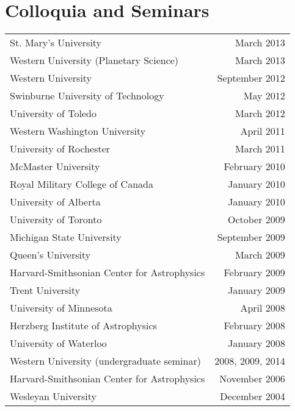 \documentclass[12pt]{article}
\begin{document}
\section{Colloquia and Seminars}
\begin{tabularx}{\textwidth}{Xr}
St. Mary's University& March 2013\\ %
Western University (Planetary Science)& March 2013\\ %
Western University& September 2012\\ %
Swinburne University of Technology& May 2012\\  %
University of Toledo& March 2012\\ %
Western Washington University& April 2011\\ %
University of Rochester& March 2011\\ %
McMaster University&  February 2010\\ %
Royal Military College of Canada& January 2010\\ %
University of Alberta& January 2010\\ %
University of Toronto&  October 2009\\%
Michigan State University& September 2009\\%
Queen's University& March 2009\\ %
Harvard-Smithsonian Center for Astrophysics& February 2009\\ %
Trent University& January 2009\\ %
University of Minnesota& April 2008\\ %
Herzberg Institute of Astrophysics& February 2008\\ %
University of Waterloo& January 2008\\ %
Western University (undergraduate seminar)& 2008, 2009, 2014\\
Harvard-Smithsonian Center for Astrophysics& November 2006\\
Wesleyan University& December 2004\\

\end{tabularx}
\end{document}
